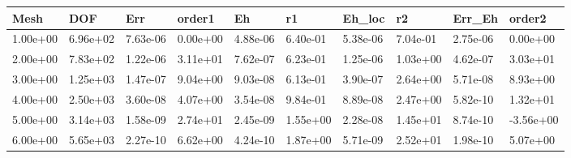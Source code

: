 \begin{tabular}{llllllllll}
Mesh & DOF & Err & order1 & Eh & r1 & Eh_loc & r2 & Err_Eh & order2 \\ 
\hline 
1.00e+00 & 6.96e+02 & 7.63e-06 & 0.00e+00 & 4.88e-06 & 6.40e-01 & 5.38e-06 & 7.04e-01 & 2.75e-06 &  0.00e+00 \\ 
2.00e+00 & 7.83e+02 & 1.22e-06 & 3.11e+01 & 7.62e-07 & 6.23e-01 & 1.25e-06 & 1.03e+00 & 4.62e-07 &  3.03e+01 \\ 
3.00e+00 & 1.25e+03 & 1.47e-07 & 9.04e+00 & 9.03e-08 & 6.13e-01 & 3.90e-07 & 2.64e+00 & 5.71e-08 &  8.93e+00 \\ 
4.00e+00 & 2.50e+03 & 3.60e-08 & 4.07e+00 & 3.54e-08 & 9.84e-01 & 8.89e-08 & 2.47e+00 & 5.82e-10 &  1.32e+01 \\ 
5.00e+00 & 3.14e+03 & 1.58e-09 & 2.74e+01 & 2.45e-09 & 1.55e+00 & 2.28e-08 & 1.45e+01 & 8.74e-10 & -3.56e+00 \\ 
6.00e+00 & 5.65e+03 & 2.27e-10 & 6.62e+00 & 4.24e-10 & 1.87e+00 & 5.71e-09 & 2.52e+01 & 1.98e-10 &  5.07e+00 \\ 
\hline 
\end{tabular}